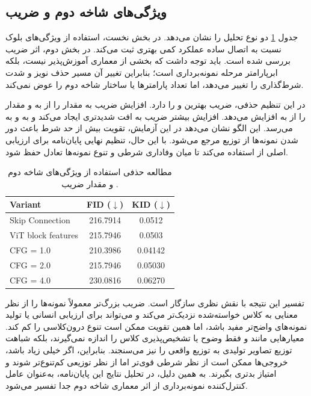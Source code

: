 \subsection{ویژگی‌های شاخه دوم و ضریب }
جدول \ref{tab:ablation_vit} دو نوع تحلیل را نشان می‌دهد. در بخش نخست، استفاده از ویژگی‌های بلوک  نسبت به اتصال ساده عملکرد کمی بهتری ثبت می‌کند. در بخش دوم، اثر ضریب  بررسی شده است. باید توجه داشت که  بخشی از معماری آموزش‌پذیر  نیست، بلکه ابرپارامتر مرحله نمونه‌برداری است؛ بنابراین تغییر آن مسیر حذف نویز و شدت شرط‌گذاری را تغییر می‌دهد، اما تعداد پارامترها یا ساختار شاخه دوم را عوض نمی‌کند.

در این تنظیم حذفی، ضریب  بهترین  و  را دارد. افزایش ضریب به  مقدار  را از  به  و مقدار  را از  به  افزایش می‌دهد. افزایش بیشتر ضریب به  افت شدیدتری ایجاد می‌کند و  به  و  به  می‌رسد. این الگو نشان می‌دهد در این آزمایش، تقویت بیش از حد شرط باعث دور شدن نمونه‌ها از توزیع مرجع می‌شود. با این حال، تنظیم نهایی پایان‌نامه برای ارزیابی اصلی از  استفاده می‌کند تا میان وفاداری شرطی و تنوع نمونه‌ها تعادل حفظ شود.

\begin{table}[htbp]
    \centering
    \caption[مطالعه حذفی شاخه دوم و ]{مطالعه حذفی استفاده از ویژگی‌های شاخه دوم و مقدار ضریب .}
    \label{tab:ablation_vit}
    \begin{latin}
    \begin{tabular}{lcc}
        \hline
        \textbf{Variant} & \textbf{FID} ($\downarrow$) & \textbf{KID} ($\downarrow$) \\
        \hline
        Skip Connection & 216.7914 & 0.0512 \\
        ViT block features & 215.7946 & 0.0503 \\
        \hline
        CFG = 1.0 & 210.3986 & 0.04142 \\
        CFG = 2.0 & 215.7946 & 0.05030 \\
        CFG = 4.0 & 230.0816 & 0.06270 \\
        \hline
    \end{tabular}
    \end{latin}
\end{table}

تفسیر این نتیجه با نقش نظری  سازگار است. ضریب بزرگ‌تر معمولاً نمونه‌ها را از نظر معنایی به کلاس خواسته‌شده نزدیک‌تر می‌کند و می‌تواند برای ارزیابی انسانی یا تولید نمونه‌های واضح‌تر مفید باشد، اما همین تقویت ممکن است تنوع درون‌کلاسی را کم کند. معیارهایی مانند  و  فقط وضوح یا تشخیص‌پذیری کلاس را اندازه نمی‌گیرند، بلکه شباهت توزیع تصاویر تولیدی به توزیع واقعی را نیز می‌سنجند. بنابراین، اگر  خیلی زیاد باشد، خروجی‌ها ممکن است از نظر شرطی قوی‌تر اما از نظر توزیعی کم‌تنوع‌تر شوند و امتیاز بدتری بگیرند. به همین دلیل، در تحلیل نتایج این پایان‌نامه،  به‌عنوان عامل کنترل‌کننده نمونه‌برداری از اثر معماری شاخه دوم جدا تفسیر می‌شود.

